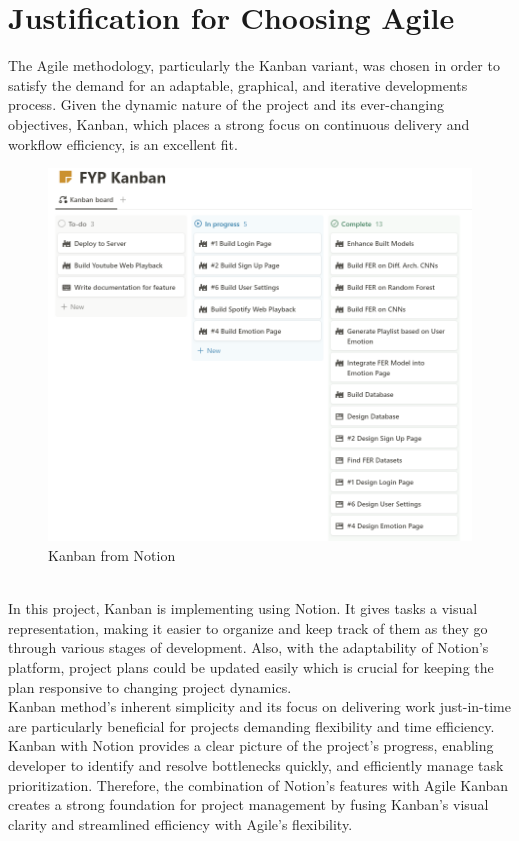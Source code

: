\section{Justification for Choosing Agile}
The Agile methodology, particularly the Kanban variant, was chosen in order to satisfy the demand for an adaptable, graphical, and iterative developments process.
Given the dynamic nature of the project and its ever-changing objectives, Kanban, which places a strong focus on continuous delivery and workflow efficiency, is an excellent fit.
\\
\begin{figure}[!ht]
    \centering
    \includegraphics[width=12cm]{Images/kanban.png}
    \caption{Kanban from Notion}
    \label{fig:kanban}
\end{figure}
\\
\indent In this project, Kanban is implementing using Notion. 
It gives tasks a visual representation, making it easier to organize and keep track of them as they go through various stages of development.
Also, with the adaptability of Notion's platform, project plans could be updated easily which is crucial for keeping the plan responsive to changing project dynamics.
\\
\indent Kanban method's inherent simplicity and its focus on delivering work just-in-time are particularly beneficial for projects demanding flexibility and time efficiency.
Kanban with Notion provides a clear picture of the project's progress, enabling developer to identify and resolve bottlenecks quickly, and efficiently manage task prioritization.
Therefore, the combination of Notion's features with Agile Kanban creates a strong foundation for project management by fusing Kanban's visual clarity and streamlined efficiency with Agile's flexibility. 

